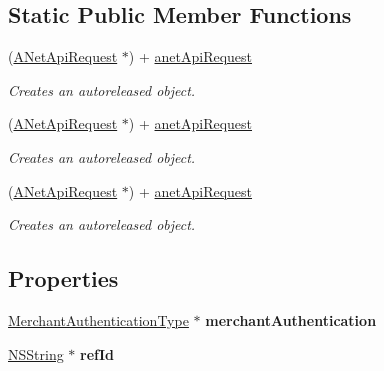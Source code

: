 \subsection*{Static Public Member Functions}
\begin{DoxyCompactItemize}
\item 
(\hyperlink{interface_a_net_api_request}{ANetApiRequest} $\ast$) + \hyperlink{interface_a_net_api_request_a389bb4ae074f13e05aeaad78328353cc}{anetApiRequest}
\begin{DoxyCompactList}\small\item\em Creates an autoreleased object. \item\end{DoxyCompactList}\item 
(\hyperlink{interface_a_net_api_request}{ANetApiRequest} $\ast$) + \hyperlink{interface_a_net_api_request_a389bb4ae074f13e05aeaad78328353cc}{anetApiRequest}
\begin{DoxyCompactList}\small\item\em Creates an autoreleased object. \item\end{DoxyCompactList}\item 
(\hyperlink{interface_a_net_api_request}{ANetApiRequest} $\ast$) + \hyperlink{interface_a_net_api_request_a389bb4ae074f13e05aeaad78328353cc}{anetApiRequest}
\begin{DoxyCompactList}\small\item\em Creates an autoreleased object. \item\end{DoxyCompactList}\end{DoxyCompactItemize}
\subsection*{Properties}
\begin{DoxyCompactItemize}
\item 
\hypertarget{interface_a_net_api_request_a4f7660c51d3c50c790bdeadb1a7b0f40}{
\hyperlink{interface_merchant_authentication_type}{MerchantAuthenticationType} $\ast$ {\bfseries merchantAuthentication}}
\label{interface_a_net_api_request_a4f7660c51d3c50c790bdeadb1a7b0f40}

\item 
\hypertarget{interface_a_net_api_request_ad57fc490535aa4e0c19bf17c46503874}{
\hyperlink{class_n_s_string}{NSString} $\ast$ {\bfseries refId}}
\label{interface_a_net_api_request_ad57fc490535aa4e0c19bf17c46503874}

\end{DoxyCompactItemize}


